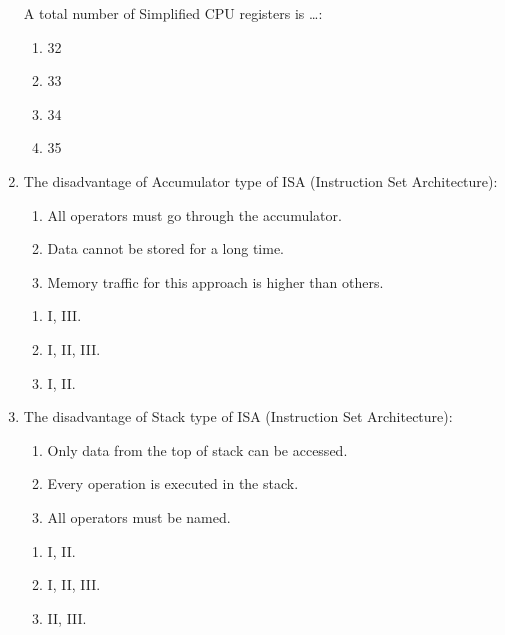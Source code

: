 \documentclass[paper=8.2in:11.6in]{scrartcl}
\begin{document}
\begin{enumerate}
A total number of Simplified CPU registers is \ldots :

\begin{enumerate}[label=\alph*)]

\item 32
\item 33
\item 34
\item 35

\end{enumerate}

\item The disadvantage of Accumulator type of ISA (Instruction Set Architecture):

\begin{enumerate}[label=\Roman*.]

\item All operators must go through the accumulator.
\item Data cannot be stored for a long time.
\item Memory traffic for this approach is higher than others.

\end{enumerate}

\begin{enumerate}[label=\alph*)]

\item I, III.
\item I, II, III.
\item I, II.

\end{enumerate}

\item The disadvantage of Stack type of ISA (Instruction Set Architecture):

\begin{enumerate}[label=\Roman*.]

\item Only data from the top of stack can be accessed.
\item Every operation is executed in the stack.
\item All operators must be named.

\end{enumerate}

\begin{enumerate}[label=\alph*)]

\item I, II.
\item I, II, III.
\item II, III.


\end{enumerate}
\end{enumerate}
\end{document}
